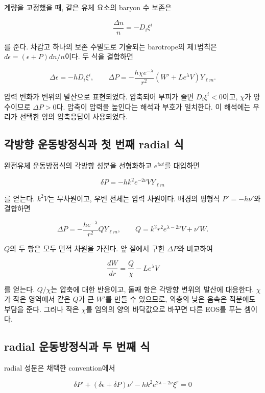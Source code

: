 \documentclass[
  10pt,
  a4paper,
]{article}
\begin{document}
계량을 고정했을 때, 같은 유체 요소의 baryon 수 보존은

\[
\frac{\Delta n}{n}=-D_i\xi^i
\]

를 준다. 차갑고 하나의 보존 수밀도로 기술되는 barotrope의 제1법칙은
\(d\epsilon=(\epsilon+P)dn/n\)이다. 두 식을 결합하면

\[
\Delta\epsilon=-h D_i\xi^i,
\qquad
\Delta P=-\frac{h\chi e^{-\lambda}}{r^2}
\left(W'+Le^\lambda V\right)Y_{\ell m}.
\]

압력 변화가 변위의 발산으로 표현되었다. 압축되어 부피가 줄면
\(D_i\xi^i<0\)이고, \(\chi\)가 양수이므로 \(\Delta P>0\)다. 압축이
압력을 높인다는 해석과 부호가 일치한다. 이 해석에는 우리가 선택한 양의
압축응답이 사용되었다.

\subsection{각방향 운동방정식과 첫 번째 radial
식}\label{uxac01uxbc29uxd5a5-uxc6b4uxb3d9uxbc29uxc815uxc2dduxacfc-uxccab-uxbc88uxc9f8-radial-uxc2dd}

완전유체 운동방정식의 각방향 성분을 선형화하고 \(e^{i\omega t}\)를
대입하면

\[
\delta P=-h k^2e^{-2\nu}VY_{\ell m}
\]

를 얻는다. \(k^2V\)는 무차원이고, 우변 전체는 압력 차원이다. 배경의
평형식 \(P'=-h\nu'\)와 결합하면

\[
\Delta P=-\frac{he^{-\lambda}}{r^2}QY_{\ell m},
\qquad
Q=k^2r^2e^{\lambda-2\nu}V+\nu'W.
\]

\(Q\)의 두 항은 모두 면적 차원을 가진다. 앞 절에서 구한 \(\Delta P\)와
비교하여

\[
\boxed{\frac{dW}{dr}=\frac{Q}{\chi}-Le^\lambda V}
\]

를 얻는다. \(Q/\chi\)는 압축에 대한 반응이고, 둘째 항은 각방향 변위의
발산에 대응한다. \(\chi\)가 작은 영역에서 같은 \(Q\)가 큰 \(W'\)를 만들
수 있으므로, 외층의 낮은 음속은 적분에도 부담을 준다. 그러나 작은
\(\chi\)를 임의의 양의 바닥값으로 바꾸면 다른 EOS를 푸는 셈이다.

\subsection{radial 운동방정식과 두 번째
식}\label{radial-uxc6b4uxb3d9uxbc29uxc815uxc2dduxacfc-uxb450-uxbc88uxc9f8-uxc2dd}

radial 성분은 채택한 convention에서

\[
\delta P'+(\delta\epsilon+\delta P)\nu'
-hk^2e^{2\lambda-2\nu}\xi^r=0
\]
\end{document}

